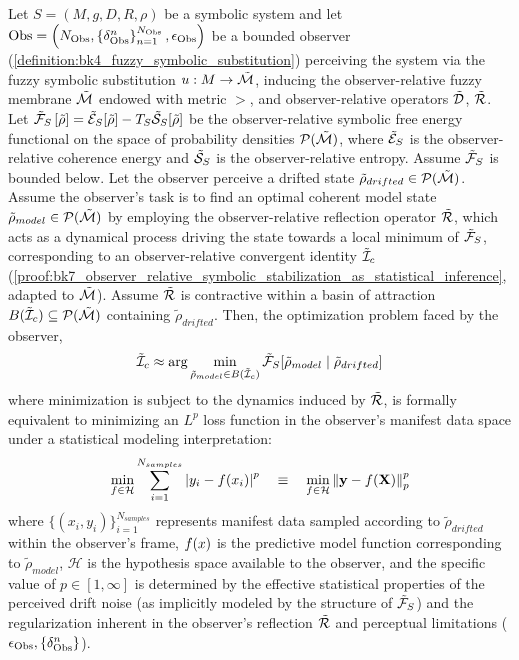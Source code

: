 \begin{theorem}
Let \( S = (M, g, D, R, \rho) \) be a symbolic system and let 
\( \mathrm{Obs} = \left(N_{\mathrm{Obs}}, \left\{ \delta^{n}_{\mathrm{Obs}} \right\}_{n=1}^{N_{\mathrm{Obs}}}, \epsilon_{\mathrm{Obs}} \right) \) 
be a bounded observer (\ref{definition:bk4_fuzzy_symbolic_substitution}) perceiving the system via the fuzzy symbolic substitution 
\( u : M \to \tilde{\mathcal{M}} \), inducing the observer-relative fuzzy membrane \( \tilde{\mathcal{M}} \) endowed with metric \( \gt \), and observer-relative operators \( \tilde{\mathcal{D}} \), \( \tilde{\mathcal{R}} \).
Let \( \tilde{\mathcal{F}}_S\left[ \tilde{\rho} \right] = \tilde{\mathcal{E}}_S[\tilde{\rho}] - T_S \tilde{\mathcal{S}}_S[\tilde{\rho}] \) be the observer-relative symbolic free energy functional on the space of probability densities \( \mathcal{P}(\tilde{\mathcal{M}}) \), where \( \tilde{\mathcal{E}}_S \) is the observer-relative coherence energy and \( \tilde{\mathcal{S}}_S \) is the observer-relative entropy. Assume \( \tilde{\mathcal{F}}_S \) is bounded below.
Let the observer perceive a drifted state \( \tilde{\rho}_{drifted} \in \mathcal{P}(\tilde{\mathcal{M}}) \). Assume the observer's task is to find an optimal coherent model state \( \tilde{\rho}_{model} \in \mathcal{P}(\tilde{\mathcal{M}}) \) by employing the observer-relative reflection operator \( \tilde{\mathcal{R}} \), which acts as a dynamical process driving the state towards a local minimum of \( \tilde{\mathcal{F}}_S \), corresponding to an observer-relative convergent identity \( \tilde{\mathcal{I}}_c \) (\ref{proof:bk7_observer_relative_symbolic_stabilization_as_statistical_inference}, adapted to \( \tilde{\mathcal{M}} \)). Assume \( \tilde{\mathcal{R}} \) is contractive within a basin of attraction \( B(\tilde{\mathcal{I}}_c) \subseteq \mathcal{P}(\tilde{\mathcal{M}}) \) containing \( \tilde{\rho}_{drifted} \).
Then, the optimization problem faced by the observer,
\[
\tilde{\mathcal{I}}_c \approx \arg\min_{\tilde{\rho}_{model} \in B(\tilde{\mathcal{I}}_c)} \tilde{\mathcal{F}}_S[ \tilde{\rho}_{model} \mid \tilde{\rho}_{drifted} ]
\]
where minimization is subject to the dynamics induced by \( \tilde{\mathcal{R}} \), is formally equivalent to minimizing an \( L^p \) loss function in the observer's manifest data space under a statistical modeling interpretation:
\[
\min_{f \in \mathcal{H}} \sum_{i=1}^{N_{samples}} \left|y_i - f(x_i)\right|^p \quad \equiv \quad \min_{f \in \mathcal{H}} \left\|\mathbf{y} - f(\mathbf{X})\right\|_p^p
\]
where \( \{(x_i, y_i)\}_{i=1}^{N_{samples}} \) represents manifest data sampled according to \( \tilde{\rho}_{drifted} \) within the observer's frame, \( f(x) \) is the predictive model function corresponding to \( \tilde{\rho}_{model} \), \( \mathcal{H} \) is the hypothesis space available to the observer, and the specific value of \( p \in [1, \infty] \) is determined by the effective statistical properties of the perceived drift noise (as implicitly modeled by the structure of \( \tilde{\mathcal{F}}_S \)) and the regularization inherent in the observer's reflection \( \tilde{\mathcal{R}} \) and perceptual limitations (\( \epsilon_{\mathrm{Obs}}, \{\delta^n_{\mathrm{Obs}}\} \)).
\end{theorem}

